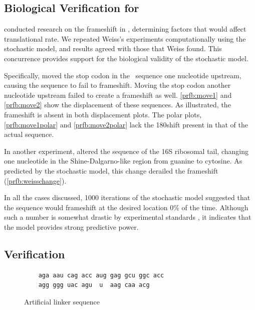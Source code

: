 \documentclass[12pt, draft]{article}
\numberwithin{equation}{section}
\begin{document}
\subsection{Biological Verification for \prfB}

\citet{weiss87,weiss88} conducted research on the
frameshift in \prfB, determining factors that would affect
translational rate.  We repeated Weiss's experiments computationally
using the stochastic model, and results agreed with those that Weiss found.
This concurrence provides support for the biological validity of
the stochastic model.


Specifically, \citeauthor{weiss87} moved the stop codon in the
\prfB\ sequence one nucleotide upstream, causing the sequence to fail to
frameshift. Moving the stop codon another nucleotide upstream failed
to create a frameshift as well. \autoref{prfb:move1} and \autoref{prfb:move2}
show the displacement of these sequences.  As illustrated,
the frameshift is absent in both displacement plots.  The polar
plots, \autoref{prfb:move1polar} and \autoref{prfb:move2polar}
lack the 180\degree shift present in that of the actual sequence.

In another experiment, \citeauthor{weiss88} altered the sequence of the
16S ribosomal tail, changing one nucleotide in the Shine-Dalgarno-like region
from guanine to cytosine.  As predicted by the stochastic model, this
change derailed the frameshift (\autoref{prfb:weisschange}).

In all the cases discussed, 1000 iterations of the stochastic model
suggested that the sequence would frameshift at the desired location 0\%
of the time.  Although such a number is somewhat drastic by experimental
standards \cite{weiss87,weiss88}, it indicates that the model provides
strong predictive power.



\subsection{Verification}

\begin{figure}
  \caption{Artificial linker sequence}
  \label{linker}
  \begin{verbatim}
    aga aau cag acc aug gag gcu ggc acc
    agg ggg uac agu  u  aag caa acg
  \end{verbatim}
\end{figure}
\end{document}
